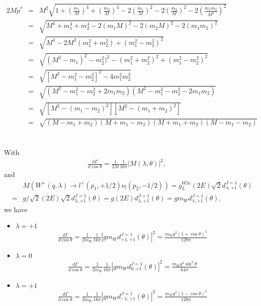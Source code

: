 \documentclass[11pt]{article}
\def\lmd{\lambda}
\def\th{\theta}
\begin{document}
\section{ }
\begin{eqnarray}
  2Mp^* &=& M^2\sqrt{1+(\frac{m_1}{M})^4+(\frac{m_2}{M})^4-2(\frac{m_1}{M})^2-2(\frac{m_2}{M})^2-2(\frac{m_1m_2}{M^2})^2}\\
  &=& \sqrt{M^4+m_1^4+m_2^4-2(m_1 M)^2-2(m_2M)^2-2(m_1m_2)^2}\\
  &=& \sqrt{M^4-2M^2(m_1^2+m_2^2)+(m_1^2-m_2^2)^2}\\
  &=& \sqrt{(M^2-m_1)^2-m_2^2)^2-(m_1^2+m_2^2)^2+(m_1^2-m_2^2)^2} \\
  &=& \sqrt{[M^2-m_1^2-m_2^2]^2-4m_1^2m_2^2} \\
  &=& \sqrt{(M^2-m_1^2-m_2^2+2m_1m_2)(M^2-m_1^2-m_2^2-2m_1m_2)}\\
  &=& \sqrt{[M^2-(m_1-m_2)^2][M^2-(m_1+m_2)^2]} \\
  &=& \sqrt{(M-m_1+m_2)(M+m_1-m_2)(M+m_1+m_2)(M-m_1-m_2)} \label{eq.19_72}
\end{eqnarray}

\section{ }
With
\begin{eqnarray}
  \frac{d\Gamma}{d\cos\theta}=\frac{1}{2M}\frac{1}{16\pi} |M(\lambda,\theta)|^2,
\end{eqnarray}
and
\begin{eqnarray}
  &&M(W^+(q,\lmd) \to l^+(p_1,+1/2) \nu_l(p_2,-1/2))
= g_L^{Wln} (2E) \sqrt{2}  d^{J=1}_{\lmd,+1}(\theta)\\
&=& g/\sqrt{2} (2E) \sqrt{2} d^{J=1}_{\lmd,+1}(\theta)
= g (2E)                   d^{J=1}_{\lmd,+1}(\theta) 
= g m_W                    d^{J=1}_{\lmd,+1}(\theta),
\end{eqnarray}
we have
\begin{itemize}
  \item $\lambda = +1$
  \begin{eqnarray}
    \frac{d\Gamma}{d\cos\theta}=\frac{1}{2m_W}\frac{1}{16\pi} |g m_W d^{J=1}_{+1,+1}(\theta)|^2 =\frac{m_W g^2(1+\cos\th)^2}{128\pi}
  \end{eqnarray}
  \item $\lambda = 0$
  \begin{eqnarray}
    \frac{d\Gamma}{d\cos\theta}=\frac{1}{2m_W}\frac{1}{16\pi} |g m_W d^{J=1}_{0,+1}(\theta)|^2 =\frac{m_Wg^2\sin^2\th}{64\pi}
  \end{eqnarray}
  \item $\lambda = +1$
  \begin{eqnarray}
    \frac{d\Gamma}{d\cos\theta}=\frac{1}{2m_W}\frac{1}{16\pi} |g m_W d^{J=1}_{-1,+1}(\theta)|^2 =\frac{m_W g^2(1-\cos\th)^2}{128\pi}
  \end{eqnarray}
\end{itemize}
\end{document}
